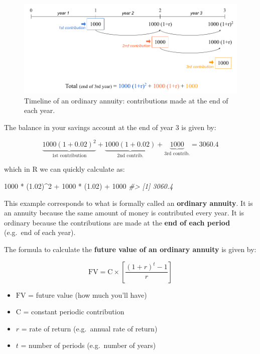 \documentclass[
]{book}
\newenvironment{Shaded}{\begin{snugshade}}{\end{snugshade}}
\newcommand{\CommentTok}[1]{\textcolor[rgb]{0.56,0.35,0.01}{\textit{#1}}}
\newcommand{\DecValTok}[1]{\textcolor[rgb]{0.00,0.00,0.81}{#1}}
\newcommand{\FloatTok}[1]{\textcolor[rgb]{0.00,0.00,0.81}{#1}}
\newcommand{\NormalTok}[1]{#1}
\newcommand{\SpecialCharTok}[1]{\textcolor[rgb]{0.00,0.00,0.00}{#1}}
\begin{document}
\begin{figure}

{\centering \includegraphics[width=0.95\linewidth]{images/conditionals/timeline-ord-annuity} 

}

\caption{Timeline of an ordinary annuity: contributions made at the end of each year.}\label{fig:unnamed-chunk-210}
\end{figure}

The balance in your savings account at the end of year 3 is given by:

\[
\underbrace{1000 (1 + 0.02)^2}_{\text{1st contribution}} + \underbrace{1000 (1 + 0.02)}_{\text{2nd contrib.}} + \underbrace{1000}_{\text{3rd contrib.}} = 3060.4
\]

which in R we can quickly calculate as:

\begin{Shaded}
\begin{Highlighting}[]
\DecValTok{1000} \SpecialCharTok{*}\NormalTok{ (}\FloatTok{1.02}\NormalTok{)}\SpecialCharTok{\^{}}\DecValTok{2} \SpecialCharTok{+} \DecValTok{1000} \SpecialCharTok{*}\NormalTok{ (}\FloatTok{1.02}\NormalTok{) }\SpecialCharTok{+} \DecValTok{1000}
\CommentTok{\#\textgreater{} [1] 3060.4}
\end{Highlighting}
\end{Shaded}

This example corresponds to what is formally called an \textbf{ordinary annuity}.
It is an annuity because the same amount of money is contributed every year.
It is ordinary because the contributions are made at the
\textbf{end of each period} (e.g.~end of each year).

The formula to calculate the \textbf{future value of an ordinary annuity} is given by:

\[
\text{FV} = \text{C} \times \left [ \frac{(1 + r)^t - 1}{r} \right]
\]

\begin{itemize}
\item
  \(\text{FV}\) = future value (how much you'll have)
\item
  \(\text{C}\) = constant periodic contribution
\item
  \(r\) = rate of return (e.g.~annual rate of return)
\item
  \(t\) = number of periods (e.g.~number of years)
\end{itemize}
\end{document}
